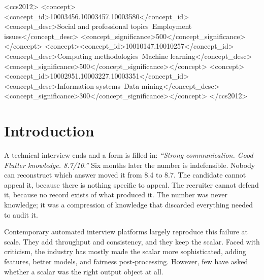 \documentclass[manuscript,screen,review=false]{acmart}
\begin{document}
\begin{CCSXML}
<ccs2012>
<concept><concept_id>10003456.10003457.10003580</concept_id>
<concept_desc>Social and professional topics~Employment issues</concept_desc>
<concept_significance>500</concept_significance></concept>
<concept><concept_id>10010147.10010257</concept_id>
<concept_desc>Computing methodologies~Machine learning</concept_desc>
<concept_significance>500</concept_significance></concept>
<concept><concept_id>10002951.10003227.10003351</concept_id>
<concept_desc>Information systems~Data mining</concept_desc>
<concept_significance>300</concept_significance></concept>
</ccs2012>
\end{CCSXML}



\maketitle

\section{Introduction}
\label{sec:intro}

A technical interview ends and a form is filled in: \emph{``Strong communication.
Good Flutter knowledge. 8.7/10.''} Six months later the number is indefensible.
Nobody can reconstruct which answer moved it from 8.4 to 8.7. The candidate
cannot appeal it, because there is nothing specific to appeal. The recruiter
cannot defend it, because no record exists of what produced it. The number was
never knowledge; it was a compression of knowledge that discarded everything
needed to audit it.

Contemporary automated interview platforms largely reproduce this failure at
scale. They add throughput and consistency, and they keep the scalar. Faced with
criticism, the industry has mostly made the scalar more sophisticated, adding features, better models, and fairness post-processing. However, few have asked whether a scalar was the right output object at all.
\end{document}
